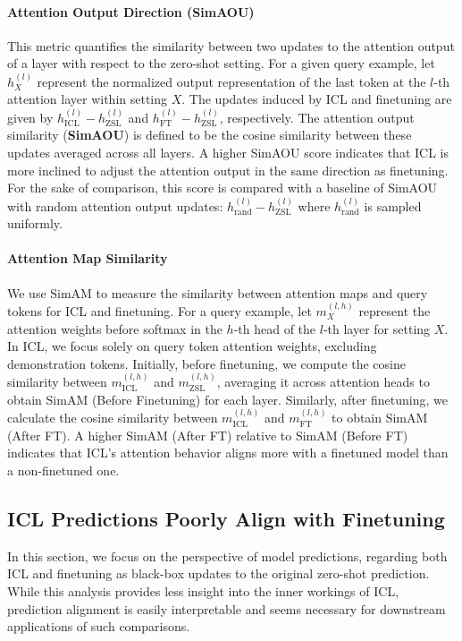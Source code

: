 \paragraph{Attention Output Direction (SimAOU)}
This metric quantifies the similarity between two updates to the attention output of a layer with respect to the zero-shot setting. 
For a given query example, let $h^{(l)}_X$ represent the normalized output representation of the last token at the $l$-th attention layer within setting $X$.
The updates induced by ICL and finetuning are given by $h^{(l)}_{\text{ICL}} - h^{(l)}_{\text{ZSL}}$ and $h^{(l)}_{\text{FT}} - h^{(l)}_{\text{ZSL}}$, respectively.
The attention output similarity (\textbf{SimAOU}) is defined to be the cosine similarity between these updates averaged across all layers.
A higher SimAOU score indicates that ICL is more inclined to adjust the attention output in the same direction as finetuning.
For the sake of comparison, this score is compared with a baseline of SimAOU with random attention output updates: $h^{(l)}_{\text{rand}} - h^{(l)}_{\text{ZSL}}$ where $h^{(l)}_{\text{rand}}$ is sampled uniformly.

\paragraph{Attention Map Similarity}
We use SimAM to measure the similarity between attention maps and query tokens for ICL and finetuning.
For a query example, let $m^{(l,h)}_X$ represent the attention weights before softmax in the $h$-th head of the $l$-th layer for setting $X$. In ICL, we focus solely on query token attention weights, excluding demonstration tokens. Initially, before finetuning, we compute the cosine similarity between $m^{(l,h)}_{\text{ICL}}$ and $m^{(l,h)}_{\text{ZSL}}$, averaging it across attention heads to obtain SimAM (Before Finetuning) for each layer.
Similarly, after finetuning, we calculate the cosine similarity between $m^{(l,h)}_{\text{ICL}}$ and $m^{(l,h)}_{\text{FT}}$ to obtain SimAM (After FT). A higher SimAM (After FT) relative to SimAM (Before FT) indicates that ICL's attention behavior aligns more with a finetuned model than a non-finetuned one.


\subsection{ICL Predictions Poorly Align with Finetuning}

In this section, we focus on the perspective of model predictions, regarding both ICL and finetuning as black-box updates to the original zero-shot prediction.
While this analysis provides less insight into the inner workings of ICL, prediction alignment is easily interpretable and seems necessary for downstream applications of such comparisons.


